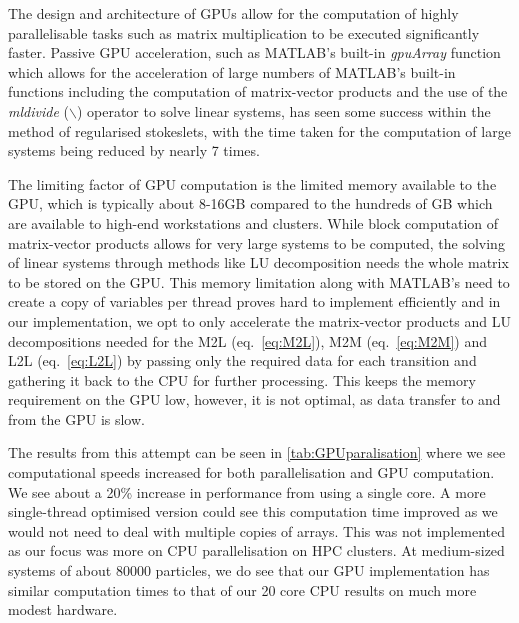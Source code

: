 The design and architecture of GPUs allow for the computation of highly parallelisable tasks such as matrix multiplication to be executed significantly faster. Passive GPU acceleration, such as MATLAB's built-in \textit{gpuArray} function which allows for the acceleration of large numbers of MATLAB's built-in functions including the computation of matrix-vector products and the use of the \textit{mldivide} ($\backslash$) operator to solve linear systems, has seen some success within the method of regularised stokeslets, with the time taken for the computation of large systems being reduced by nearly 7 times\cite{Gallagher2020}. 

The limiting factor of GPU computation is the limited memory available to the GPU, which is typically about 8-16GB compared to the hundreds of GB which are available to high-end workstations and clusters. While block computation of matrix-vector products allows for very large systems to be computed, the solving of linear systems through methods like LU decomposition needs the whole matrix to be stored on the GPU. This memory limitation along with MATLAB's need to create a copy of variables per thread proves hard to implement efficiently and in our implementation, we opt to only accelerate the matrix-vector products and LU decompositions needed for the M2L (eq.~\ref{eq:M2L}), M2M (eq.~\ref{eq:M2M}) and L2L (eq.~\ref{eq:L2L}) by passing only the required data for each transition and gathering it back to the CPU for further processing. This keeps the memory requirement on the GPU low, however, it is not optimal, as data transfer to and from the GPU is slow. 

The results from this attempt can be seen in \cref{tab:GPUparalisation} where we see computational speeds increased for both parallelisation and GPU computation. We see about a 20\% increase in performance from using a single core. A more single-thread optimised version could see this computation time improved as we would not need to deal with multiple copies of arrays. This was not implemented as our focus was more on CPU parallelisation on HPC clusters. At medium-sized systems of about 80000 particles, we do see that our GPU implementation has similar computation times to that of our 20 core CPU results on much more modest hardware. 

